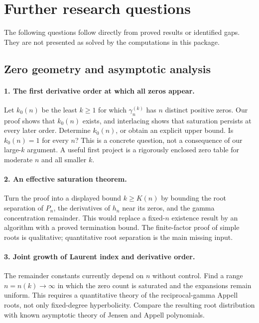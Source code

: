 \section{Further research questions}
\label{questions:section}

The following questions follow directly from proved results or identified
gaps.  They are not presented as solved by the computations in this package.

\subsection{Zero geometry and asymptotic analysis}

\paragraph{1. The first derivative order at which all zeros appear.}
Let $k_0(n)$ be the least $k\geq1$ for which $\gamma_n^{(k)}$ has
$n$ distinct positive zeros.  Our proof shows that $k_0(n)$ exists,
and interlacing shows that saturation persists at every later order.
Determine $k_0(n)$, or obtain an explicit upper bound.
Is $k_0(n)=1$ for every $n$?  This is a concrete question, not a
consequence of our large-$k$ argument.  A useful first project is a
rigorously enclosed zero table for moderate $n$ and all smaller $k$.

\paragraph{2. An effective saturation theorem.}
Turn the proof into a displayed bound $k\geq K(n)$ by bounding the root
separation of $P_n$, the derivatives of $h_n$ near its zeros, and the
gamma concentration remainder.  This would replace a fixed-$n$
existence result by an algorithm with a proved termination bound.
The finite-factor proof of simple roots is qualitative; quantitative
root separation is the main missing input.

\paragraph{3. Joint growth of Laurent index and derivative order.}
The remainder constants currently depend on $n$ without control.
Find a range $n=n(k)\to\infty$ in which the zero count is saturated and
the expansions remain uniform.  This requires a quantitative theory
of the reciprocal-gamma Appell roots, not only fixed-degree
hyperbolicity.  Compare the resulting root distribution with known
asymptotic theory of Jensen and Appell polynomials.

